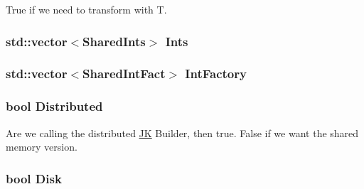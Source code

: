 True if we need to transform with T. \hypertarget{classpsi_1_1scf_1_1Psi4JK_abf9e78c6ffafd24366286f9dbf937e14}{
\subsubsection[{Ints}]{\setlength{\rightskip}{0pt plus 5cm}std::vector$<${\bf SharedInts}$>$ {\bf Ints}}}
\label{classpsi_1_1scf_1_1Psi4JK_abf9e78c6ffafd24366286f9dbf937e14}
\hypertarget{classpsi_1_1scf_1_1Psi4JK_a63f6583dc209a73acfa1cb9c7cfc3553}{
\subsubsection[{IntFactory}]{\setlength{\rightskip}{0pt plus 5cm}std::vector$<${\bf SharedIntFact}$>$ {\bf IntFactory}}}
\label{classpsi_1_1scf_1_1Psi4JK_a63f6583dc209a73acfa1cb9c7cfc3553}
\hypertarget{classJKBuilder_1_1JK_a072479da68be17a25570325316eade23}{
\subsubsection[{Distributed}]{\setlength{\rightskip}{0pt plus 5cm}bool {\bf Distributed}}}
\label{classJKBuilder_1_1JK_a072479da68be17a25570325316eade23}


Are we calling the distributed \hyperlink{classJKBuilder_1_1JK}{JK} Builder, then true. False if we want the shared memory version. \hypertarget{classJKBuilder_1_1JK_a6324fcb7d27b80663a26f90a35f2e9b9}{
\subsubsection[{Disk}]{\setlength{\rightskip}{0pt plus 5cm}bool {\bf Disk}}}
\label{classJKBuilder_1_1JK_a6324fcb7d27b80663a26f90a35f2e9b9}


